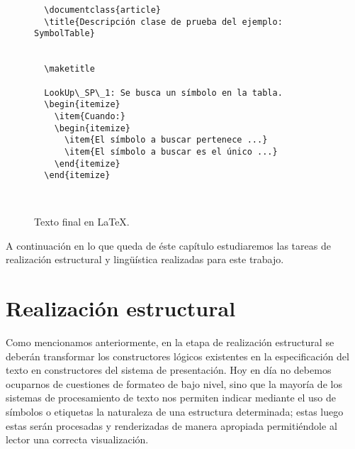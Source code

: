 \begin{figure}[H]
  \begin{verbatim}
  \documentclass{article}
  \title{Descripción clase de prueba del ejemplo: SymbolTable}
  
  
  \maketitle

  LookUp\_SP\_1: Se busca un símbolo en la tabla.  
  \begin{itemize}
    \item{Cuando:}
    \begin{itemize}
      \item{El símbolo a buscar pertenece ...}
      \item{El símbolo a buscar es el único ...}   
    \end{itemize}
  \end{itemize}
  
  
  \end{verbatim}
  \caption{Texto final en \LaTeX.}
  \label{fig:ej_latex}
\end{figure}

A continuación en lo que queda de éste capítulo estudiaremos las tareas de realización estructural y lingüística realizadas para este trabajo.

\section{Realización estructural}
\label{cap:structure_realization}


Como mencionamos anteriormente, en la etapa de realización estructural se deberán transformar los constructores lógicos existentes en la especificación del texto en constructores del sistema de presentación. Hoy en día no debemos ocuparnos de cuestiones de formateo de bajo nivel, sino que la mayoría de los sistemas de procesamiento de texto nos permiten indicar mediante el uso de símbolos o etiquetas la naturaleza de una estructura determinada; estas luego estas serán procesadas y renderizadas de manera apropiada permitiéndole al lector una correcta visualización.

